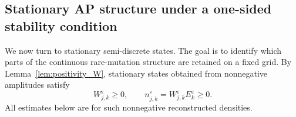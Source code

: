 \documentclass[11pt]{article}
\newtheorem{remark}{Remark}[section]
\begin{document}



\subsection{Stationary AP structure under a one-sided stability condition}
\label{subsec:stationary_discrete_AP}

We now turn to stationary semi-discrete states. The goal is to identify which
parts of the continuous rare-mutation structure are retained on a fixed grid.
By Lemma~\ref{lem:positivity_W}, stationary states obtained from nonnegative
amplitudes satisfy
\[
    W_{j,k}^\varepsilon\ge0,
    \qquad
    n_{j,k}^\varepsilon
    =W_{j,k}^\varepsilon E_k^\varepsilon\ge0 .
\]
All estimates below are for such nonnegative reconstructed densities.
\end{document}
